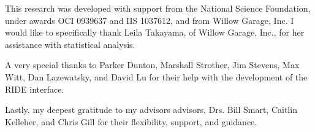 \begin{thesisacknowledgments}
This research was developed with support from the National Science Foundation, under awards OCI 0939637 and IIS 1037612, and from Willow Garage, Inc. I would like to specifically thank Leila Takayama, of Willow Garage, Inc., for her assistance with statistical analysis.

A very special thanks to Parker Dunton, Marshall Strother, Jim Stevens, Max Witt, Dan Lazewatsky, and David Lu for their help with the development of the RIDE interface.

Lastly, my deepest gratitude to my advisors advisors, Drs. Bill Smart, Caitlin Kelleher, and Chris Gill for their flexibility, support, and guidance.
\end{thesisacknowledgments}

\begin{thesisdedicationpage}                %
\end{thesisdedicationpage}

\begin{singlespace}
\tableofcontents

\iffalse
\renewcommand{\listoftablespostscript}{
\small
\textbf{Note:} Be consistent in aligning multi-lined table-names, figure-names,
and chapter/section-names throughout your document.  It is generally
recommended to make sure any additional lines (i.e., within a long title or a
long table name) wrap and align immediately under the 1st character of the
title or name with which they are associated in the line immediately above ---
as shown in the ``Table 2.1'' example above.   Whatever approach you take, be
consistent.}
\fi

\listoftables

\listoffigures
\end{singlespace}

	



